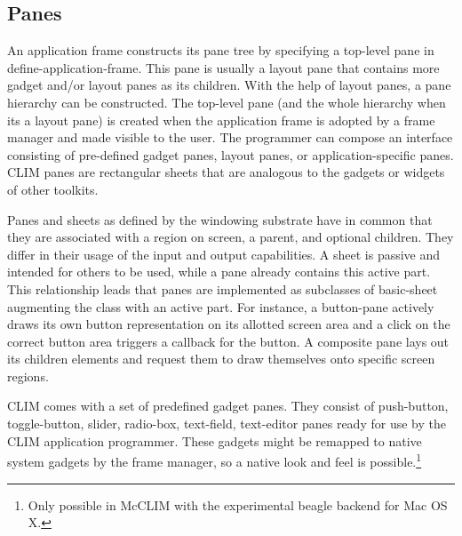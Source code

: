 \documentclass[twocolumn,a4paper]{article}
\newcommand {\code}[1]{{\sffamily #1}}
\newcommand {\CLIM}{{\small CLIM}}
\let\class\code
\let\macro\code
\begin{document}


\subsection{Panes}

An application frame constructs its pane tree by specifying a
top-level pane in \macro{define-application-frame}. This pane is
usually a layout pane that contains more gadget and/or layout panes as
its children. With the help of layout panes, a pane hierarchy can be
constructed. The top-level pane (and the whole hierarchy when its a
layout pane) is created when the application frame is adopted by a
frame manager and made visible to the user. The programmer can compose
an interface consisting of pre-defined gadget panes, layout panes, or
application-specific panes. \CLIM{} panes are rectangular sheets that
are analogous to the gadgets or widgets of other toolkits.

Panes and sheets as defined by the windowing substrate have in common
that they are associated with a region on screen, a parent, and
optional children. They differ in their usage of the input and output
capabilities. A sheet is passive and intended for others to be used,
while a pane already contains this active part. This relationship
leads that panes are implemented as subclasses of \class{basic-sheet}
augmenting the class with an active part. For instance, a button-pane
actively draws its own button representation on its allotted screen
area and a click on the correct button area triggers a callback for
the button. A composite pane lays out its children elements and
request them to draw themselves onto specific screen regions.

\CLIM{} comes with a set of predefined gadget panes. They consist of
push-button, toggle-button, slider, radio-box, text-field, text-editor
panes ready for use by the \CLIM{} application programmer. These
gadgets might be remapped to native system gadgets by the frame
manager, so a native look and feel is possible.\footnote{Only possible
  in McCLIM with the experimental beagle backend for Mac OS X.}
\end{document}
